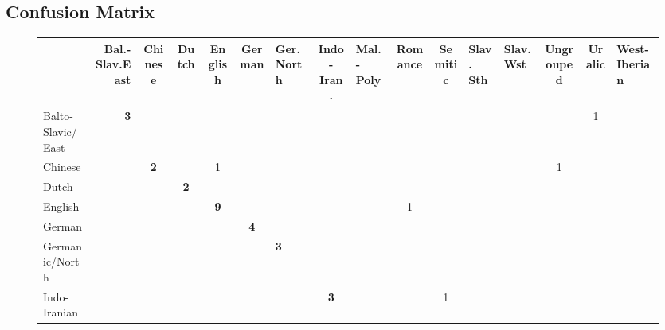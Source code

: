 \documentclass[a4paper,10pt]{article}
\begin{document}
\subsection{Confusion Matrix}

\begin{landscape}
\begin{figure}[H]
\begin{tabularx}{\textwidth}{XrccccXcXccXXccX}
\toprule
{} &  Bal.-Slav.East &  Chinese &  Dutch &  English &  German &  Ger. North &  Indo-Iran. &  Mal.-Poly &  Romance &  Semitic &  Slav. Sth &  Slav. Wst &  Ungrouped &  Uralic &  West-Iberian \\
\midrule
Balto-Slavic/East &         \textbf{3} &          &        &          &         &                 &               &                    &          &          &               &              &            &       1 &               \\
\midrule
    Chinese           &                    & \textbf{2} &        &        1 &         &                 &               &                    &          &          &               &              &          1 &         &               \\
\midrule
    Dutch             &                    &          & \textbf{2} &          &         &                 &               &                    &          &          &               &              &            &         &               \\
\midrule
    English           &                    &          &        & \textbf{9} &         &                 &               &                    &        1 &          &               &              &            &         &               \\
\midrule
    German            &                    &          &        &          & \textbf{4} &                 &               &                    &          &          &               &              &            &         &               \\
\midrule
    Germanic/North    &                    &          &        &          &         &   \textbf{3}    &               &                    &          &          &               &              &            &         &               \\
\midrule
    Indo-Iranian      &                    &          &        &          &         &                 &  \textbf{3}   &                    &          &        1 &               &              &            &         &               \\

\end{tabularx}
\end{figure}
\end{landscape}
\end{document}
